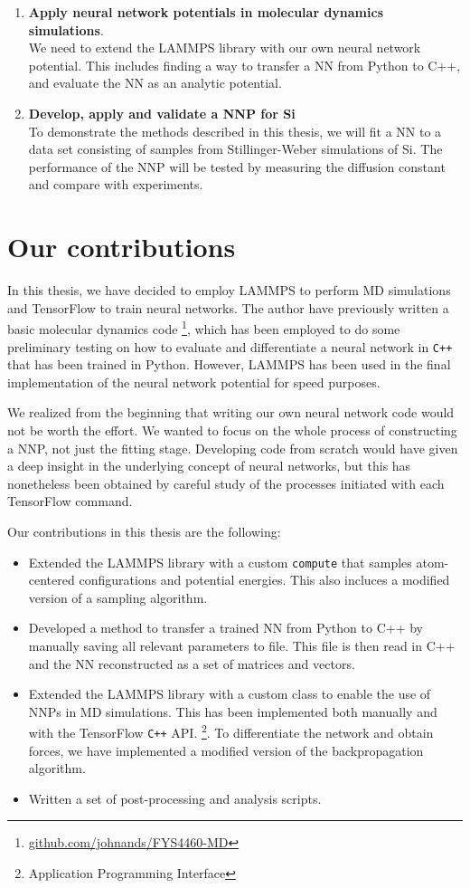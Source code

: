\documentclass[twoside,english]{uiofysmaster}
\begin{document}
\begin{enumerate}[label=\textbf{\alph*)}]
 \item \textbf{Apply neural network potentials in molecular dynamics simulations}. \\
 We need to extend the LAMMPS library with our own neural network potential. This includes finding a way 
 to transfer a NN from Python to C++, and evaluate the NN as an analytic potential. 
 
 \item \textbf{Develop, apply and validate a NNP for Si} \\
 To demonstrate the methods described in this thesis, we will fit a NN to a data set consisting 
 of samples from Stillinger-Weber simulations of Si. The performance of the NNP will be tested 
 by measuring the diffusion constant and compare with experiments. 
\end{enumerate}

\section{Our contributions}
In this thesis, we have decided to employ LAMMPS to perform MD simulations and TensorFlow to train neural networks.
The author have previously written a basic molecular dynamics code 
\footnote{\href{https://github.com/johnands/FYS4460-MD}{github.com/johnands/FYS4460-MD}}, 
which has been employed to do some preliminary testing on 
how to evaluate and differentiate a neural network in \texttt{C++} that has been trained in Python. However, LAMMPS has been used in 
the final implementation of the neural network potential for speed purposes.

We realized from the beginning that writing our own neural network code would not be worth the effort. 
We wanted to focus on the whole process of constructing a NNP, not just the fitting stage. 
Developing code from scratch would have given a deep insight in the underlying concept of neural networks, 
but this has nonetheless been obtained by careful study of the processes initiated with each TensorFlow command. 

Our contributions in this thesis are the following:
\begin{itemize}
 \item Extended the LAMMPS library with a custom \texttt{compute} that samples atom-centered configurations and potential 
 energies. This also incluces a modified version of a sampling algorithm. 
 \item Developed a method to transfer a trained NN from Python to C++ by manually saving all relevant parameters to file. 
 This file is then read in C++ and the NN reconstructed as a set of matrices and vectors. 
 \item Extended the LAMMPS library with a custom class to enable the use of NNPs in MD simulations. 
 This has been implemented both manually and with the TensorFlow \texttt{C++} API. \footnote{Application Programming Interface}. 
 To differentiate the network and obtain forces, we have implemented a modified version of the backpropagation algorithm.
 \item Written a set of post-processing and analysis scripts. 
\end{itemize}
\end{document}
